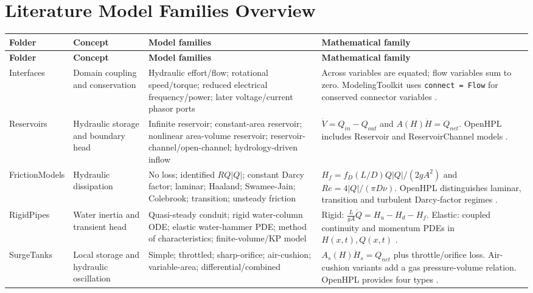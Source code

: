 \documentclass[10pt,a4paper]{article}
\begin{document}
\section{Literature Model Families Overview}
\small
\begin{longtable}{p{2.2cm}p{3.0cm}p{4.8cm}p{5.1cm}}
\toprule
\textbf{Folder} & \textbf{Concept} & \textbf{Model families} & \textbf{Mathematical family} \\
\midrule
\endfirsthead
\toprule
\textbf{Folder} & \textbf{Concept} & \textbf{Model families} & \textbf{Mathematical family} \\
\midrule
\endhead

Interfaces &
Domain coupling and conservation &
Hydraulic effort/flow; rotational speed/torque; reduced electrical frequency/power; later voltage/current phasor ports &
Across variables are equated; flow variables sum to zero. ModelingToolkit uses \texttt{connect = Flow} for conserved connector variables \cite{MTK}. \\[1ex]

Reservoirs &
Hydraulic storage and boundary head &
Infinite reservoir; constant-area reservoir; nonlinear area-volume reservoir; reservoir-channel/open-channel; hydrology-driven inflow &
$\dot V=Q_{in}-Q_{out}$ and $A(H)\dot H=Q_{net}$. OpenHPL includes Reservoir and ReservoirChannel models \cite{OpenHPLWaterway}. \\[1ex]

FrictionModels &
Hydraulic dissipation &
No loss; identified $RQ|Q|$; constant Darcy factor; laminar; Haaland; Swamee-Jain; Colebrook; transition; unsteady friction &
$H_f=f_D(L/D)Q|Q|/(2gA^2)$ and $Re=4|Q|/(\pi D\nu)$. OpenHPL distinguishes laminar, transition and turbulent Darcy-factor regimes \cite{OpenHPLDarcy}. \\[1ex]

RigidPipes &
Water inertia and transient head &
Quasi-steady conduit; rigid water-column ODE; elastic water-hammer PDE; method of characteristics; finite-volume/KP model &
Rigid: $\frac{L}{gA}\dot Q=H_u-H_d-H_f$. Elastic: coupled continuity and momentum PDEs in $H(x,t),Q(x,t)$ \cite{WaterHammerReview}. \\[1ex]

SurgeTanks &
Local storage and hydraulic oscillation &
Simple; throttled; sharp-orifice; air-cushion; variable-area; differential/combined &
$A_s(H)\dot H_s=Q_{net}$ plus throttle/orifice loss. Air-cushion variants add a gas pressure-volume relation. OpenHPL provides four types \cite{OpenHPLSurge}. \\[1ex]


\end{longtable}
\end{document}
